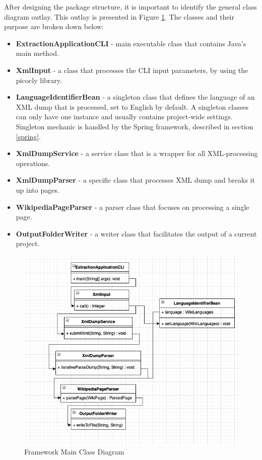 \documentclass[thesis=M,english,hidelinks]{FITthesis}[2019/12/23]
\begin{document}
After designing the package structure, it is important to identify the general class diagram outlay. This outlay is presented in Figure \ref{fig:frameworkclassdiagram}. The classes and their purpose are broken down below:

\begin{itemize}
	\item \textbf{ExtractionApplicationCLI} - main executable class that contains Java's main method.
	\item \textbf{XmlInput} - a class that processes the \gls{CLI} input parameters, by using the picocly library\cite{picocli_library}.
	\item \textbf{LanguageIdentifierBean} - a singleton class that defines the language of an XML dump that is processed, set to English by default. A singleton classes can only have one instance and usually contains project-wide settings. Singleton mechanic is handled by the Spring framework, described in section \ref{spring}.
	\item \textbf{XmlDumpService} -  a service class that is a wrapper for all XML-processing operations.
	\item \textbf{XmlDumpParser} - a specific class that processes XML dump and breaks it up into pages.
	\item \textbf{WikipediaPageParser} - a parser class that focuses on processing a single page.
	\item \textbf{OutputFolderWriter} - a writer class that facilitates the output of a current project.
\end{itemize}

\begin{figure}
	\centering
	\includegraphics[width=1.0\linewidth]{framework_class_diagram}
	\caption{Framework Main Class Diagram}
	\label{fig:frameworkclassdiagram}
\end{figure}
\end{document}
